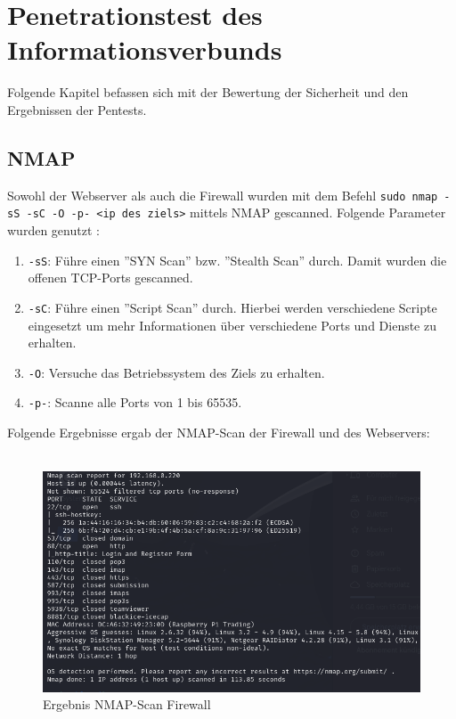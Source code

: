 \documentclass[
    a4paper,
    pagesize,
	pdftex,
    12pt,
]{scrartcl}
\begin{document}
\newpage
\section{Penetrationstest des Informationsverbunds}
Folgende Kapitel befassen sich mit der Bewertung der Sicherheit und den Ergebnissen der Pentests.

\subsection{NMAP}
Sowohl der Webserver als auch die Firewall wurden mit dem Befehl  \lstinline[breaklines]|sudo nmap -sS -sC -O -p- <ip des ziels>| mittels NMAP gescanned. 
Folgende Parameter wurden genutzt \cite{nmap-manual}:
\begin{enumerate}
	\item \lstinline[breaklines]|-sS|: Führe einen ''SYN Scan'' bzw. ''Stealth Scan'' durch. Damit wurden die offenen TCP-Ports gescanned. 
	\item \lstinline[breaklines]|-sC|: Führe einen ''Script Scan'' durch. Hierbei werden verschiedene Scripte eingesetzt um mehr Informationen über verschiedene Ports und Dienste zu erhalten.
	\item \lstinline[breaklines]|-O|: Versuche das Betriebssystem des Ziels zu erhalten.
	\item \lstinline[breaklines]|-p-|: Scanne alle Ports von 1 bis 65535.
\end{enumerate} 
Folgende Ergebnisse ergab der NMAP-Scan der Firewall und des Webservers: \\ \\
\begin{figure}[!ht]
	\centering
	\includegraphics[width=15cm]{nmap-scan-firewall.png}
	\caption{Ergebnis NMAP-Scan Firewall}
	\label{fig:nmapfirewall}
\end{figure} 
\end{document}
